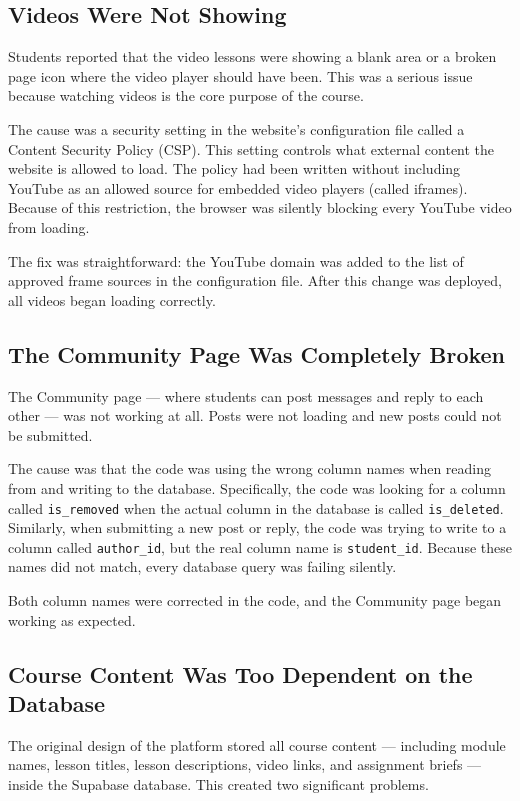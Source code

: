 \documentclass[12pt, a4paper]{article}
\begin{document}
\subsection{Videos Were Not Showing}

Students reported that the video lessons were showing a blank area or a broken page icon where the video player should have been. This was a serious issue because watching videos is the core purpose of the course.

The cause was a security setting in the website's configuration file called a Content Security Policy (CSP). This setting controls what external content the website is allowed to load. The policy had been written without including YouTube as an allowed source for embedded video players (called iframes). Because of this restriction, the browser was silently blocking every YouTube video from loading.

The fix was straightforward: the YouTube domain was added to the list of approved frame sources in the configuration file. After this change was deployed, all videos began loading correctly.

\subsection{The Community Page Was Completely Broken}

The Community page --- where students can post messages and reply to each other --- was not working at all. Posts were not loading and new posts could not be submitted.

The cause was that the code was using the wrong column names when reading from and writing to the database. Specifically, the code was looking for a column called \texttt{is\_removed} when the actual column in the database is called \texttt{is\_deleted}. Similarly, when submitting a new post or reply, the code was trying to write to a column called \texttt{author\_id}, but the real column name is \texttt{student\_id}. Because these names did not match, every database query was failing silently.

Both column names were corrected in the code, and the Community page began working as expected.

\subsection{Course Content Was Too Dependent on the Database}

The original design of the platform stored all course content --- including module names, lesson titles, lesson descriptions, video links, and assignment briefs --- inside the Supabase database. This created two significant problems.
\end{document}
